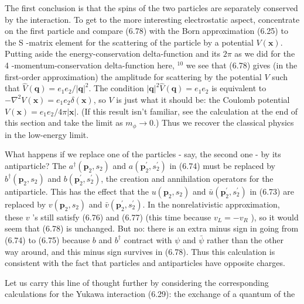 \documentclass[10pt, letterpaper]{article}
\begin{document}
The first conclusion is that the spins of the two particles are separately conserved by the interaction. To get to the more interesting electrostatic aspect, concentrate on the first particle and compare (6.78) with the Born approximation (6.25) to the S -matrix element for the scattering of the particle by a potential $V(\mathbf{x})$. Putting aside the energy-conservation delta-function and its $2 \pi$ as we did for the 4 -momentum-conservation delta-function here, ${ }^{10}$ we see that (6.78) gives (in the first-order approximation) the amplitude for scattering by the potential $V$ such that $\widehat{V}(\mathbf{q})=e_{1} e_{2} /|\mathbf{q}|^{2}$. The condition $|\mathbf{q}|^{2} \widehat{V}(\mathbf{q})=e_{1} e_{2}$ is equivalent to $-\nabla^{2} V(\mathbf{x})=e_{1} e_{2} \delta(\mathbf{x})$, so $V$ is just what it should be: the Coulomb potential $V(\mathbf{x})=e_{1} e_{2} / 4 \pi|\mathbf{x}|$. (If this result isn't familiar, see the calculation at the end of this section and take the limit as $m_{\phi} \rightarrow 0$.) Thus we recover the classical physics in the low-energy limit.

What happens if we replace one of the particles - say, the second one - by its antiparticle? The $a^{\dagger}\left(\mathbf{p}_{2}, s_{2}\right)$ and $a\left(\mathbf{p}_{2}^{\prime}, s_{2}^{\prime}\right)$ in (6.74) must be replaced by $b^{\dagger}\left(\mathbf{p}_{2}, s_{2}\right)$ and $b\left(\mathbf{p}_{2}^{\prime}, s_{2}^{\prime}\right)$, the creation and annihilation operators for the antiparticle. This has the effect that the $u\left(\mathbf{p}_{2}, s_{2}\right)$ and $\bar{u}\left(\mathbf{p}_{2}^{\prime}, s_{2}^{\prime}\right)$ in (6.73) are replaced by $v\left(\mathbf{p}_{2}, s_{2}\right)$ and $\bar{v}\left(\mathbf{p}_{2}^{\prime}, s_{2}^{\prime}\right)$. In the nonrelativistic approximation, these $v$ 's still satisfy (6.76) and (6.77) (this time because $v_{L}=-v_{R}$ ), so it would seem that (6.78) is unchanged. But no: there is an extra minus sign in going from (6.74) to (6.75) because $b$ and $b^{\dagger}$ contract with $\psi$ and $\bar{\psi}$ rather than the other way around, and this minus sign survives in (6.78). Thus this calculation is consistent with the fact that particles and antiparticles have opposite charges.

Let us carry this line of thought further by considering the corresponding calculations for the Yukawa interaction (6.29): the exchange of a quantum of the
\end{document}
